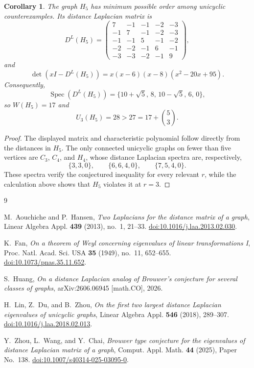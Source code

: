 \documentclass[11pt]{amsart}
\newtheorem{corollary}[theorem]{Corollary}
\theoremstyle{remark}
\newcommand{\DL}{D^{L}}
\begin{document}
\begin{corollary}\label{cor:five}
The graph $H_5$ has minimum possible order among unicyclic counterexamples. Its distance Laplacian matrix is
\[
\DL(H_5)=
\begin{pmatrix}
 7&-1&-1&-2&-3\\
-1& 7&-1&-2&-3\\
-1&-1& 5&-1&-2\\
-2&-2&-1& 6&-1\\
-3&-3&-2&-1& 9
\end{pmatrix},
\]
and
\[
\det(xI-\DL(H_5))
=x(x-6)(x-8)(x^2-20x+95).
\]
Consequently,
\[
\operatorname{Spec}(\DL(H_5))
=\{10+\sqrt5,\,8,\,10-\sqrt5,\,6,\,0\},
\]
so $W(H_5)=17$ and
\[
U_3(H_5)=28>27=17+\binom53.
\]
\end{corollary}

\begin{proof}
The displayed matrix and characteristic polynomial follow directly from the distances in $H_5$. The only connected unicyclic graphs on fewer than five vertices are $C_3$, $C_4$, and $H_4$, whose distance Laplacian spectra are, respectively,
\[
\{3,3,0\},
\qquad
\{6,6,4,0\},
\qquad
\{7,5,4,0\}.
\]
These spectra verify the conjectured inequality for every relevant $r$, while the calculation above shows that $H_5$ violates it at $r=3$.
\end{proof}

\begin{thebibliography}{9}

M.~Aouchiche and P.~Hansen,
\emph{Two Laplacians for the distance matrix of a graph},
Linear Algebra Appl. \textbf{439} (2013), no.~1, 21--33.
\href{https://doi.org/10.1016/j.laa.2013.02.030}{doi:10.1016/j.laa.2013.02.030}.

K.~Fan,
\emph{On a theorem of Weyl concerning eigenvalues of linear transformations I},
Proc. Natl. Acad. Sci. USA \textbf{35} (1949), no.~11, 652--655.
\href{https://doi.org/10.1073/pnas.35.11.652}{doi:10.1073/pnas.35.11.652}.

S.~Huang,
\emph{On a distance Laplacian analog of Brouwer's conjecture for several classes of graphs},
arXiv:2606.06945 [math.CO], 2026.

H.~Lin, Z.~Du, and B.~Zhou,
\emph{On the first two largest distance Laplacian eigenvalues of unicyclic graphs},
Linear Algebra Appl. \textbf{546} (2018), 289--307.
\href{https://doi.org/10.1016/j.laa.2018.02.013}{doi:10.1016/j.laa.2018.02.013}.

Y.~Zhou, L.~Wang, and Y.~Chai,
\emph{Brouwer type conjecture for the eigenvalues of distance Laplacian matrix of a graph},
Comput. Appl. Math. \textbf{44} (2025), Paper No.~138.
\href{https://doi.org/10.1007/s40314-025-03095-0}{doi:10.1007/s40314-025-03095-0}.

\end{thebibliography}
\end{document}
